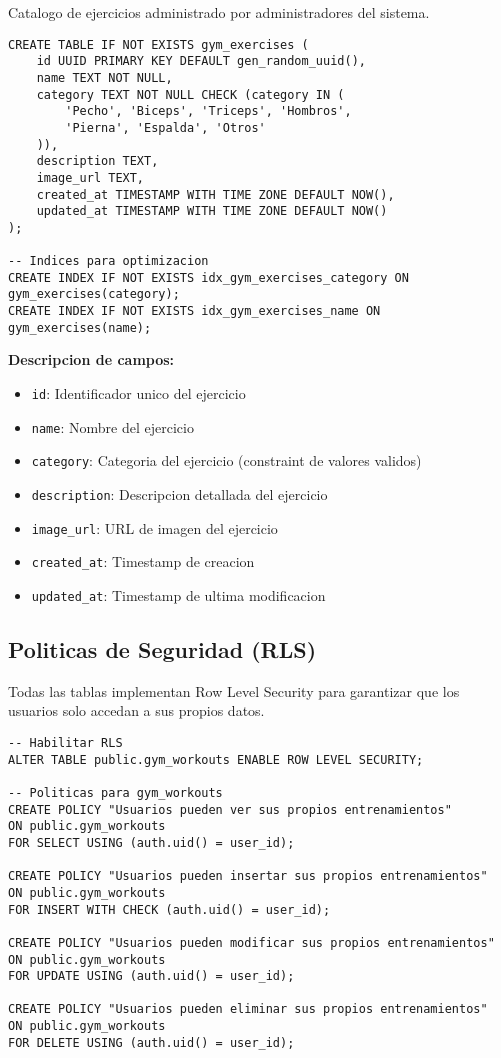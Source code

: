 \documentclass[12pt,a4paper]{article}
\begin{document}
Catalogo de ejercicios administrado por administradores del sistema.

\begin{lstlisting}[style=sqlstyle, caption=Estructura completa de gym_exercises]
CREATE TABLE IF NOT EXISTS gym_exercises (
    id UUID PRIMARY KEY DEFAULT gen_random_uuid(),
    name TEXT NOT NULL,
    category TEXT NOT NULL CHECK (category IN (
        'Pecho', 'Biceps', 'Triceps', 'Hombros', 
        'Pierna', 'Espalda', 'Otros'
    )),
    description TEXT,
    image_url TEXT,
    created_at TIMESTAMP WITH TIME ZONE DEFAULT NOW(),
    updated_at TIMESTAMP WITH TIME ZONE DEFAULT NOW()
);

-- Indices para optimizacion
CREATE INDEX IF NOT EXISTS idx_gym_exercises_category ON gym_exercises(category);
CREATE INDEX IF NOT EXISTS idx_gym_exercises_name ON gym_exercises(name);
\end{lstlisting}

\textbf{Descripcion de campos:}
\begin{itemize}
    \item \texttt{id}: Identificador unico del ejercicio
    \item \texttt{name}: Nombre del ejercicio
    \item \texttt{category}: Categoria del ejercicio (constraint de valores validos)
    \item \texttt{description}: Descripcion detallada del ejercicio
    \item \texttt{image\_url}: URL de imagen del ejercicio
    \item \texttt{created\_at}: Timestamp de creacion
    \item \texttt{updated\_at}: Timestamp de ultima modificacion
\end{itemize}

\subsection{Politicas de Seguridad (RLS)}

Todas las tablas implementan Row Level Security para garantizar que los usuarios solo accedan a sus propios datos.

\begin{lstlisting}[style=sqlstyle, caption=Politicas RLS para gym_workouts]
-- Habilitar RLS
ALTER TABLE public.gym_workouts ENABLE ROW LEVEL SECURITY;

-- Politicas para gym_workouts
CREATE POLICY "Usuarios pueden ver sus propios entrenamientos"
ON public.gym_workouts
FOR SELECT USING (auth.uid() = user_id);

CREATE POLICY "Usuarios pueden insertar sus propios entrenamientos"
ON public.gym_workouts
FOR INSERT WITH CHECK (auth.uid() = user_id);

CREATE POLICY "Usuarios pueden modificar sus propios entrenamientos"
ON public.gym_workouts
FOR UPDATE USING (auth.uid() = user_id);

CREATE POLICY "Usuarios pueden eliminar sus propios entrenamientos"
ON public.gym_workouts
FOR DELETE USING (auth.uid() = user_id);
\end{lstlisting}
\end{document}
